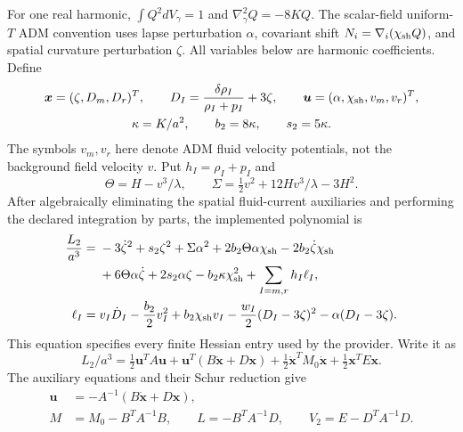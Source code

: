 For one real harmonic, $\int Q^2dV_\gamma=1$ and
$\nabla_\gamma^2Q=-8KQ$.  The scalar-field uniform-$T$ ADM convention uses
lapse perturbation $\alpha$, covariant shift
$N_i=\nabla_i(\chi_{\rm sh}Q)$, and spatial curvature perturbation $\zeta$.
All variables below are harmonic coefficients.  Define
\begin{equation}
 \begin{gathered}
 \boldsymbol{x}=(\zeta,D_m,D_r)^T,\qquad
 D_I=\frac{\delta\rho_I}{\rho_I+p_I}+3\zeta,\qquad
 \boldsymbol{u}=(\alpha,\chi_{\rm sh},v_m,v_r)^T,\\
 \kappa=K/a^2,\qquad b_2=8\kappa,\qquad s_2=5\kappa .
 \end{gathered}
 \label{eq:app-action-variables}
\end{equation}
The symbols $v_m,v_r$ here denote ADM fluid velocity potentials, not the
background field velocity $v$.  Put $h_I=\rho_I+p_I$ and
\begin{equation}
 \Theta=H-v^3/\lambda,\qquad
 \Sigma=\tfrac12v^2+12Hv^3/\lambda-3H^2 .
 \label{eq:app-theta-sigma}
\end{equation}
After algebraically eliminating the spatial fluid-current auxiliaries and
performing the declared integration by parts, the implemented polynomial is
\begin{align}
 \frac{L_2}{a^3}={}&-3\dot\zeta^2+s_2\zeta^2+\Sigma\alpha^2
 +2b_2\Theta\alpha\chi_{\rm sh}-2b_2\dot\zeta\chi_{\rm sh}
 \nonumber\\
 &+6\Theta\alpha\dot\zeta+2s_2\alpha\zeta
 -b_2\kappa\chi_{\rm sh}^2+\sum_{I=m,r}h_I\ell_I,\nonumber\\
 \ell_I={}&
 v_I\dot D_I-\frac{b_2}{2}v_I^2+b_2\chi_{\rm sh}v_I
 -\frac{w_I}{2}(D_I-3\zeta)^2-\alpha(D_I-3\zeta).
 \label{eq:app-finite-action}
\end{align}
This equation specifies every finite Hessian entry used by the provider.
Write it as
\begin{equation}
 L_2/a^3=\tfrac12\boldsymbol{u}^TA\boldsymbol{u}
 +\boldsymbol{u}^T(B\dot{\boldsymbol{x}}+D\boldsymbol{x})
 +\tfrac12\dot{\boldsymbol{x}}^TM_0\dot{\boldsymbol{x}}
 +\tfrac12\boldsymbol{x}^TE\boldsymbol{x} .
 \label{eq:app-block-action}
\end{equation}
The auxiliary equations and their Schur reduction give
\begin{align}
 \boldsymbol{u}&=-A^{-1}(B\dot{\boldsymbol{x}}+D\boldsymbol{x}),\nonumber\\
 M&=M_0-B^TA^{-1}B,\qquad
 L=-B^TA^{-1}D,\qquad V_2=E-D^TA^{-1}D .
 \label{eq:app-schur}
\end{align}

